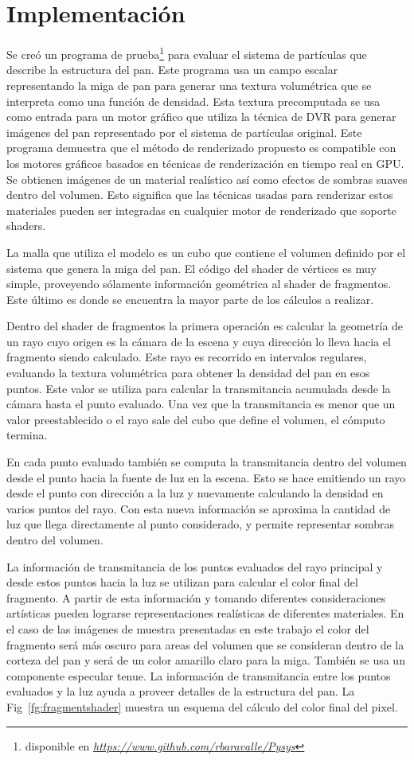 \documentclass[spanish,a4paper,openright,11pt]{book}
\begin{document}
\section{Implementación}
Se cre\'o un programa de prueba\footnote{disponible en \emph{\url{https://www.github.com/rbaravalle/Pysys}}} para evaluar el sistema de partículas que describe la estructura del pan. Este programa usa un campo escalar representando la miga de pan para generar una textura volumétrica que se interpreta como una función de densidad. Esta textura precomputada se usa como entrada para un motor gráfico que utiliza la técnica de DVR para generar imágenes del pan representado por el sistema de partículas original. Este programa demuestra que el método de renderizado propuesto es compatible con los motores gráficos basados en técnicas de renderización en tiempo real en GPU. Se obtienen imágenes de un material realístico así como efectos de sombras suaves dentro del volumen. Esto significa que las técnicas usadas para renderizar estos materiales pueden ser integradas en cualquier motor de renderizado que soporte shaders.

La malla que utiliza el modelo es un cubo que contiene el volumen definido por el sistema que genera la miga del pan. El código del shader de vértices es muy simple, proveyendo sólamente información geométrica al shader de fragmentos. Este último es donde se encuentra la mayor parte de los cálculos a realizar.

Dentro del shader de fragmentos la primera operaci\'on es calcular la geometría de un rayo cuyo origen es la cámara de la escena y cuya dirección lo lleva hacia el fragmento siendo calculado. Este rayo es recorrido en intervalos regulares, evaluando la textura volumétrica para obtener la densidad del pan en esos puntos. Este valor se utiliza para calcular la transmitancia acumulada desde la cámara hasta el punto evaluado. Una vez que la transmitancia es menor que un valor preestablecido o el rayo sale del cubo que define el volumen, el cómputo termina.

En cada punto evaluado también se computa la transmitancia dentro del volumen desde el punto hacia la fuente de luz en la escena. Esto se hace emitiendo un rayo desde el punto con dirección a la luz y nuevamente calculando la densidad en varios puntos del rayo. Con esta nueva información se aproxima la cantidad de luz que llega directamente al punto considerado, y permite representar sombras dentro del volumen.

La información de transmitancia de los puntos evaluados del rayo principal y desde estos puntos hacia la luz se utilizan para calcular el color final del fragmento. A partir de esta información y tomando diferentes consideraciones artísticas pueden lograrse representaciones realísticas de diferentes materiales. En el caso de las imágenes de muestra presentadas en este trabajo el color del fragmento será más oscuro para areas del volumen que se consideran dentro de la corteza del pan y será de un color amarillo claro para la miga. También se usa un componente especular tenue. La información de transmitancia entre los puntos evaluados y la luz ayuda a proveer detalles de la estructura del pan. La Fig~\ref{fg:fragmentshader} muestra un esquema del cálculo del color final del pixel.
\end{document}
